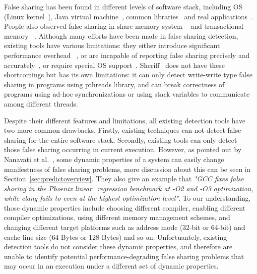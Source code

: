False sharing has been found in different levels of software stack, including
OS (Linux kernel~\cite{OSfalsesharing}), Java virtual machine~\cite{JVMfalsesharing}, 
common libraries~\cite{libfalsesharing} and real applications~\cite{appfalsesharing, mysql}. 
People also observed false sharing in share memory system
~\cite{dsmfalsesharing} and transactional memory ~\cite{tmfalsesharing}.
Although many efforts have been made in false sharing detection, existing
tools have various limitations:
they either introduce significant performance overhead~
\cite{falseshare:simulator, falseshare:binaryinstrumentation1,falseshare:binaryinstrumentation2}, or 
are incapable of reporting false sharing 
precisely and accurately~\cite{qinzhaodetection, detect:ptu, detect:intel, falseshare:binaryinstrumentation1, DProf, falseshare:binaryinstrumentation2}, 
or require special OS support~\cite{OSdetection}.
Sheriff~\cite{sheriff} does not have these shortcomings but has its own limitations: 
it can only detect write-write type false sharing in programs using pthreads library,
and can break correctness of programs using ad-hoc synchronizations or using stack variables to 
communicate among different threads. 

Despite their different features and limitations, all existing detection tools 
have two more common drawbacks.
Firstly, existing techniques can not detect false sharing for 
the entire software stack.
Secondly, existing tools can only detect those false sharing occurring in current execution.
However, as pointed out by Nanavati et al.~\cite{OSdetection}, 
some dynamic properties of a system can easily change manifestness of false sharing problems,
more discussion about this can be seen in Section~\ref{sec:predictoverview}.
They also give an example that 
{\it "GCC fixes false sharing in the Phoenix linear\_regression benchmark 
at -O2 and -O3 optimization, while clang fails to even at the highest
optimization level".}
To our understanding, those dynamic properties include 
choosing different compiler, 
enabling different compiler optimizations, 
using different memory management schemes,
and changing different target platforms such as address mode (32-bit or 64-bit) and cache line
size (64 Bytes or 128 Bytes) and so on. 
Unfortuantely, existing detection tools do not consider these dynamic properties, and
therefore are unable to identify potential performance-degrading false
sharing problems that may occur in an execution under a different set of 
dynamic properties.

